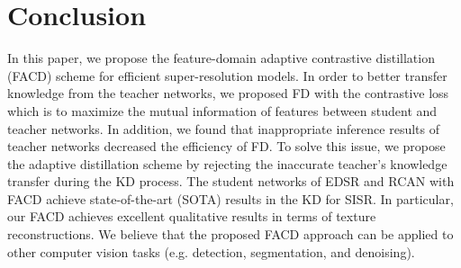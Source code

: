 \documentclass[10pt,twocolumn,letterpaper]{article}
\begin{document}
\section{Conclusion}
In this paper, we propose the feature-domain adaptive contrastive distillation (FACD) scheme for efficient super-resolution models. In order to better transfer knowledge from the teacher networks, we proposed FD with the contrastive loss which is to maximize the mutual information of features between student and teacher networks. In addition, we found that inappropriate inference results of teacher networks decreased the efficiency of FD. To solve this issue, we propose the adaptive distillation scheme by rejecting the inaccurate teacher's knowledge transfer during the KD process. The student networks of EDSR and RCAN with FACD achieve state-of-the-art (SOTA) results in the KD for SISR. In particular, our FACD achieves excellent qualitative results in terms of texture reconstructions. We believe that the proposed FACD approach can be applied to other computer vision tasks (e.g. detection, segmentation, and denoising).





{\small


}
\end{document}
